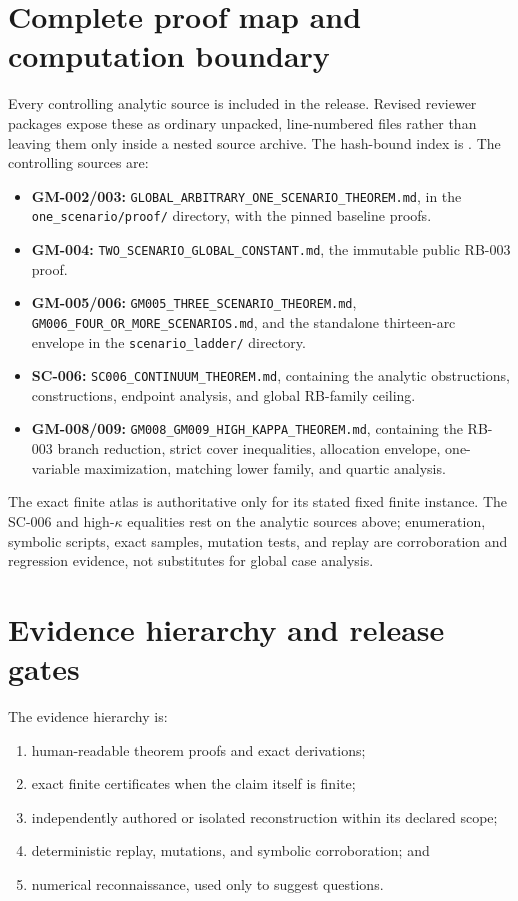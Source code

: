 \documentclass[11pt]{article}
\theoremstyle{remark}
\begin{document}
\section{Complete proof map and computation boundary}

Every controlling analytic source is included in the release. Revised
reviewer packages expose these as ordinary unpacked, line-numbered files rather
than leaving them only inside a nested source archive. The hash-bound index is
. The
controlling sources are:

\begin{itemize}[leftmargin=2em]
\item \textbf{GM-002/003:}
\texttt{GLOBAL\_ARBITRARY\_ONE\_SCENARIO\_THEOREM.md}, in the
\texttt{one\_scenario/proof/} directory, with the pinned baseline proofs.
\item \textbf{GM-004:}
\texttt{TWO\_SCENARIO\_GLOBAL\_CONSTANT.md}, the immutable public RB-003 proof.
\item \textbf{GM-005/006:}
\texttt{GM005\_THREE\_SCENARIO\_THEOREM.md},
\texttt{GM006\_FOUR\_OR\_MORE\_SCENARIOS.md}, and the standalone thirteen-arc
envelope in the \texttt{scenario\_ladder/} directory.
\item \textbf{SC-006:}
\texttt{SC006\_CONTINUUM\_THEOREM.md}, containing the analytic obstructions,
constructions, endpoint analysis, and global RB-family ceiling.
\item \textbf{GM-008/009:}
\texttt{GM008\_GM009\_HIGH\_KAPPA\_THEOREM.md}, containing the RB-003 branch
reduction, strict cover inequalities, allocation envelope, one-variable
maximization, matching lower family, and quartic analysis.
\end{itemize}

The exact finite atlas is authoritative only for its stated fixed finite
instance. The SC-006 and high-$\kappa$ equalities rest on the analytic sources
above; enumeration, symbolic scripts, exact samples, mutation tests, and
replay are corroboration and regression evidence, not substitutes for global
case analysis.

\section{Evidence hierarchy and release gates}

The evidence hierarchy is:

\begin{enumerate}[leftmargin=2em]
\item human-readable theorem proofs and exact derivations;
\item exact finite certificates when the claim itself is finite;
\item independently authored or isolated reconstruction within its declared
scope;
\item deterministic replay, mutations, and symbolic corroboration; and
\item numerical reconnaissance, used only to suggest questions.
\end{enumerate}
\end{document}
